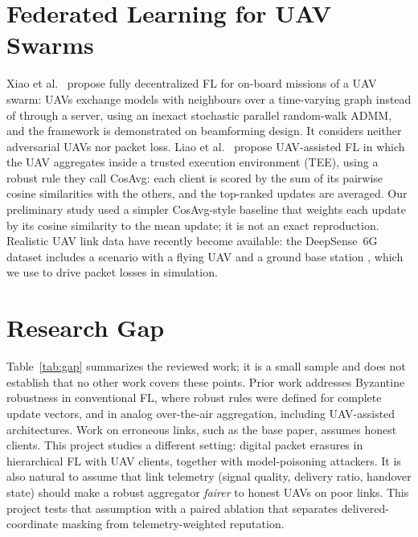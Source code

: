 \section{Federated Learning for UAV Swarms}
Xiao et al.~\cite{xiao2021uavswarm} propose fully decentralized FL for
on-board missions of a UAV swarm: UAVs exchange models with neighbours over a
time-varying graph instead of through a server, using an inexact stochastic parallel
random-walk ADMM, and the framework is demonstrated on beamforming design. It
considers neither adversarial UAVs nor packet loss. Liao et al.~\cite{liao2023tee} propose
UAV-assisted FL in which the UAV aggregates inside a trusted execution environment
(TEE), using a robust rule they call CosAvg: each client is scored by the sum of its
pairwise cosine similarities with the others, and the top-ranked updates are averaged.
Our preliminary study used a simpler CosAvg-style baseline that weights each update by
its cosine similarity to the mean update; it is not an exact reproduction. Realistic UAV link data have recently become
available: the DeepSense~6G dataset \cite{alkhateeb2023deepsense} includes a
scenario with a flying UAV and a ground base station \cite{charan2025drone}, which we
use to drive packet losses in simulation.

\section{Research Gap}
Table~\ref{tab:gap} summarizes the reviewed work; it is a small sample and does not
establish that no other work covers these points. Prior work addresses Byzantine
robustness in conventional FL, where robust rules were defined for complete update
vectors, and in analog over-the-air aggregation, including UAV-assisted
architectures. Work on erroneous links, such as the base paper, assumes honest
clients. This project studies a different setting: digital packet erasures in
hierarchical FL with UAV clients, together with model-poisoning attackers. It is also
natural to assume that link telemetry (signal quality, delivery ratio, handover state)
should make a robust aggregator \emph{fairer} to honest UAVs on poor links. This
project tests that assumption with a paired ablation that separates
delivered-coordinate masking from telemetry-weighted reputation.

